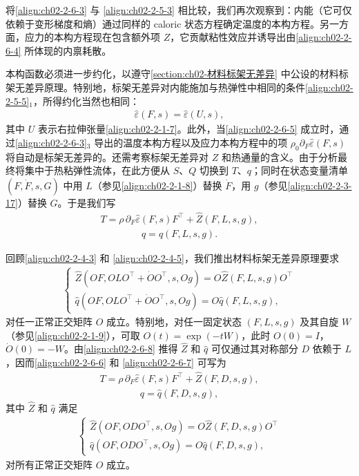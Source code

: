 \documentclass[../../main.tex]{subfiles}
\begin{document}
将\eqref{align:ch02-2-6-3} 与 \eqref{align:ch02-2-5-3} 相比较，我们再次观察到：内能（它可仅依赖于变形梯度和熵）通过同样的 caloric 状态方程确定温度的本构方程。另一方面，应力的本构方程现在包含额外项 $Z$，它贡献粘性效应并诱导出由\eqref{align:ch02-2-6-4} 所体现的内禀耗散。

本构函数必须进一步约化，以遵守\cref{section:ch02-材料标架无差异} 中公设的材料标架无差异原理。特别地，标架无差异对内能施加与热弹性中相同的条件\eqref{align:ch02-2-5-5}$_{1}$，所得约化当然也相同：
\begin{align}
\hat{\varepsilon}(F,s)=\hat{\varepsilon}(U,s),
\label{align:ch02-2-6-5}
\end{align}
其中 $U$ 表示右拉伸张量\eqref{align:ch02-2-1-7}。此外，当\eqref{align:ch02-2-6-5} 成立时，通过\eqref{align:ch02-2-6-3}$_{3}$ 导出的温度本构方程以及应力本构方程中的项 $\rho_{0}\partial_{F}\hat{\varepsilon}(F,s)$ 将自动是标架无差异的。还需考察标架无差异对 $Z$ 和热通量的含义。由于分析最终将集中于热粘弹性流体，在此方便从 $S$、$Q$ 切换到 $T$、$q$；同时在状态变量清单 $(F,\dot{F},s,G)$ 中用 $L$（参见\eqref{align:ch02-2-1-8}）替换 $\dot{F}$，用 $g$（参见\eqref{align:ch02-2-3-17}）替换 $G$。于是我们写
\begin{align}
T=\rho\,\partial_{F}\hat{\varepsilon}(F,s)F^{\top}+\hat{Z}(F,L,s,g),
\label{align:ch02-2-6-6}
\end{align}
\begin{align}
q=\hat{q}(F,L,s,g).
\label{align:ch02-2-6-7}
\end{align}

回顾\eqref{align:ch02-2-4-3} 和 \eqref{align:ch02-2-4-5}，我们推出材料标架无差异原理要求
\begin{align}
\begin{cases}
\hat{Z}(OF,OLO^{\top}+\dot{O}O^{\top},s,Og)=O\hat{Z}(F,L,s,g)O^{\top}\\
\hat{q}(OF,OLO^{\top}+\dot{O}O^{\top},s,Og)=O\hat{q}(F,L,s,g),
\end{cases}
\label{align:ch02-2-6-8}
\end{align}
对任一正常正交矩阵 $O$ 成立。特别地，对任一固定状态 $(F,L,s,g)$ 及其自旋 $W$（参见\eqref{align:ch02-2-1-9}），可取 $O(t)=\exp(-tW)$，此时 $O(0)=I$，$\dot{O}(0)=-W$。由\eqref{align:ch02-2-6-8} 推得 $\hat{Z}$ 和 $\hat{q}$ 可仅通过其对称部分 $D$ 依赖于 $L$，因而\eqref{align:ch02-2-6-6} 和 \eqref{align:ch02-2-6-7} 可写为
\begin{align}
T=\rho\,\partial_{F}\hat{\varepsilon}(F,s)F^{\top}+\hat{Z}(F,D,s,g),
\label{align:ch02-2-6-9}
\end{align}
\begin{align}
q=\hat{q}(F,D,s,g),
\label{align:ch02-2-6-10}
\end{align}
其中 $\hat{Z}$ 和 $\hat{q}$ 满足
\begin{align}
\begin{cases}
\hat{Z}(OF,ODO^{\top},s,Og)=O\hat{Z}(F,D,s,g)O^{\top}\\
\hat{q}(OF,ODO^{\top},s,Og)=O\hat{q}(F,D,s,g),
\end{cases}
\label{align:ch02-2-6-11}
\end{align}
对所有正常正交矩阵 $O$ 成立。
\end{document}
